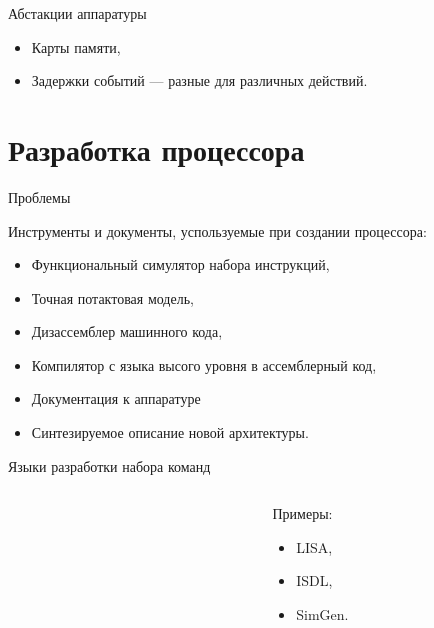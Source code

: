 \begin{frame}{Абстакции аппаратуры}

\begin{itemize}
    \item Карты памяти,
    \item Задержки событий --- разные для различных действий.
\end{itemize}

\end{frame}

\section{Разработка процессора}

\begin{frame}{Проблемы}

Инструменты и документы, успользуемые при создании процессора:

\begin{itemize}
    \item Функциональный симулятор набора инструкций,
    \item Точная потактовая модель,
    \item Дизассемблер машинного кода,
    \item Компилятор с языка высого уровня в ассемблерный код,
    \item Документация к аппаратуре
    \item Синтезируемое описание новой архитектуры.
\end{itemize}

\end{frame}

\begin{frame}{Языки разработки набора команд}

\begin{columns}[t]
    \begin{column}[T]{0.7\textwidth}
    \begin{figure}
        \centering
    \end{figure}
    \end{column}

    \begin{column}[T]{0.3\textwidth}
        Примеры:
        \begin{itemize}
            \item LISA,
            \item ISDL,
            \item SimGen.
        \end{itemize}
    \end{column}
\end{columns}

\end{frame}

